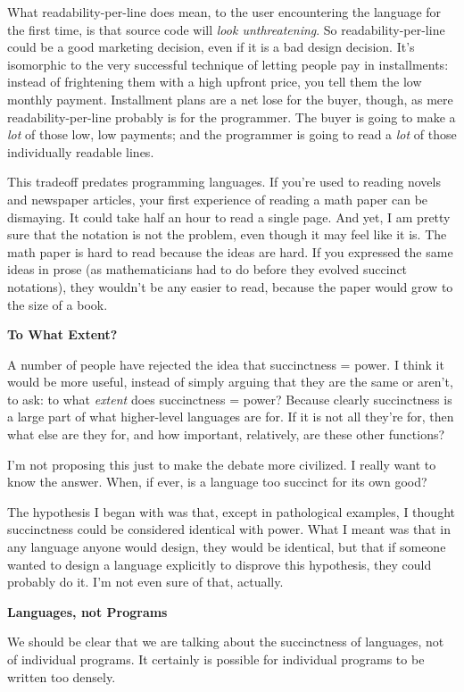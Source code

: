 \documentclass[12pt]{book}
\begin{document}
What readability-per-line does mean, to the user encountering the
language for the first time, is that source code will \emph{look
unthreatening}. So readability-per-line could be a good marketing
decision, even if it is a bad design decision. It's isomorphic to the
very successful technique of letting people pay in installments: instead
of frightening them with a high upfront price, you tell them the low
monthly payment. Installment plans are a net lose for the buyer, though,
as mere readability-per-line probably is for the programmer. The buyer
is going to make a \emph{lot} of those low, low payments; and the
programmer is going to read a \emph{lot} of those individually readable
lines.

This tradeoff predates programming languages. If you're used to reading
novels and newspaper articles, your first experience of reading a math
paper can be dismaying. It could take half an hour to read a single
page. And yet, I am pretty sure that the notation is not the problem,
even though it may feel like it is. The math paper is hard to read
because the ideas are hard. If you expressed the same ideas in prose (as
mathematicians had to do before they evolved succinct notations), they
wouldn't be any easier to read, because the paper would grow to the size
of a book.

\textbf{To What Extent?}

A number of people have rejected the idea that succinctness = power. I
think it would be more useful, instead of simply arguing that they are
the same or aren't, to ask: to what \emph{extent} does succinctness =
power? Because clearly succinctness is a large part of what higher-level
languages are for. If it is not all they're for, then what else are they
for, and how important, relatively, are these other functions?

I'm not proposing this just to make the debate more civilized. I really
want to know the answer. When, if ever, is a language too succinct for
its own good?

The hypothesis I began with was that, except in pathological examples, I
thought succinctness could be considered identical with power. What I
meant was that in any language anyone would design, they would be
identical, but that if someone wanted to design a language explicitly to
disprove this hypothesis, they could probably do it. I'm not even sure
of that, actually.

\textbf{Languages, not Programs}

We should be clear that we are talking about the succinctness of
languages, not of individual programs. It certainly is possible for
individual programs to be written too densely.
\end{document}
